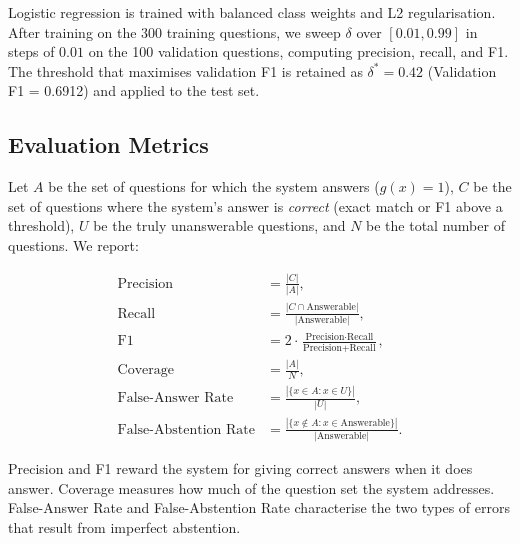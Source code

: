 Logistic regression is trained with balanced class weights and L2 regularisation.
After training on the 300 training questions, we sweep $\delta$ over $[0.01, 0.99]$ in steps
of $0.01$ on the 100 validation questions, computing precision, recall, and F1. The threshold
that maximises validation F1 is retained as $\delta^* = 0.42$ (Validation F1 = 0.6912) and applied to the test set.

\subsection{Evaluation Metrics}
\label{sec:meth_metrics}

Let $A$ be the set of questions for which the system answers ($g(x)=1$), $C$ be
the set of questions where the system's answer is \emph{correct} (exact match
or F1 above a threshold), $U$ be the truly unanswerable questions, and $N$
be the total number of questions. We report:

\begin{align}
  \text{Precision} &= \frac{|C|}{|A|},
  \label{eq:precision} \\[4pt]
  \text{Recall} &= \frac{|C \cap \text{Answerable}|}{|\text{Answerable}|},
  \label{eq:recall} \\[4pt]
  \text{F1} &= 2 \cdot \frac{\text{Precision} \cdot \text{Recall}}
                              {\text{Precision} + \text{Recall}},
  \label{eq:f1} \\[4pt]
  \text{Coverage} &= \frac{|A|}{N},
  \label{eq:coverage} \\[4pt]
  \text{False-Answer Rate} &= \frac{|\{x \in A : x \in U\}|}{|U|},
  \label{eq:far} \\[4pt]
  \text{False-Abstention Rate} &= \frac{|\{x \notin A : x \in \text{Answerable}\}|}{|\text{Answerable}|}.
  \label{eq:fab}
\end{align}

Precision and F1 reward the system for giving correct answers when it does
answer. Coverage measures how much of the question set the system addresses.
False-Answer Rate and False-Abstention Rate characterise the two types of
errors that result from imperfect abstention.
